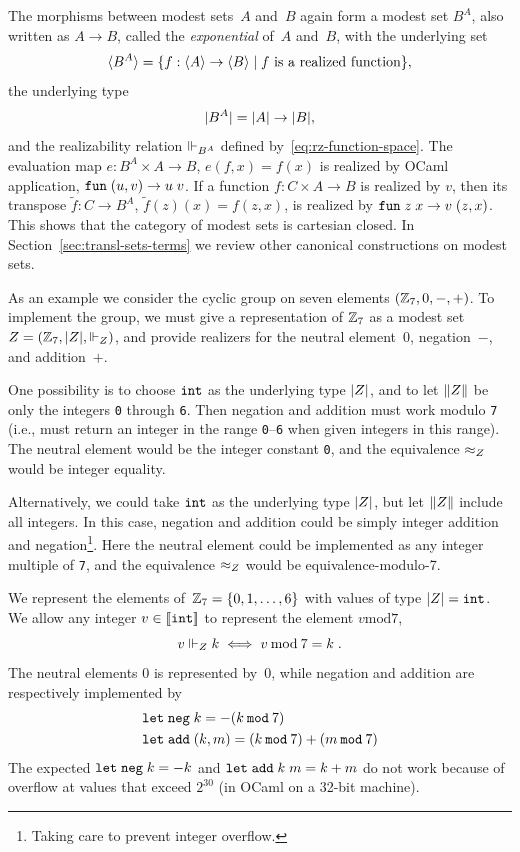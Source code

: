 The morphisms between modest sets~$A$ and~$B$ again form a modest set
$B^A$, also written as $A \to B$, called the \emph{exponential} of~$A$
and~$B$, with the underlying set
%
\begin{equation*}
  \langle B^A \rangle =
  \{f : \langle A \rangle \to \langle B \rangle \mid \text{$f$ is a realized function}\},
\end{equation*}
%
the underlying type
%
\begin{equation*}
  |B^A| = |A| \to |B|,
\end{equation*}
%
and the realizability relation $\Vdash_{B^A}$ defined
by~\eqref{eq:rz-function-space}. The evaluation map $e : B^A \times A
\to B$, $e(f,x) = f(x)$ is realized by OCaml application,
$\mathtt{fun}\;(u,v) \to u\;v$. If a function $f : C \times A \to B$ is realized
by $v$, then its transpose $\tilde{f} : C \to B^A$, $\tilde{f}(z)(x) =
f(z,x)$, is realized by $\mathtt{fun}\;z\;x \to v \; (z,x)$. This shows that the
category of modest sets is cartesian closed. In
Section~\ref{sec:transl-sets-terms} we review other canonical
constructions on modest sets.

\bigskip

As an example we consider the cyclic group on seven elements $(\mathbb{Z}_7,
0, {-}, {+})$. To implement the group, we must give a representation
of $\mathbb{Z}_7$ as a modest set~$Z = (\mathbb{Z}_7, |Z|, {\Vdash_Z})$, and
provide realizers for the neutral element~$0$, negation~$-$, and
addition~$+$. 

One possibility is to choose $\mathtt{int}$ as the underlying type $|Z|$,
and to let $\|Z\|$ be only the integers \texttt{0} through \texttt{6}.
Then negation and addition must work modulo \texttt{7} (i.e., must return an integer in the
range \texttt{0}--\texttt{6} when given integers in this range).
The neutral element would be the integer constant \texttt{0}, and the
equivalence $\approx_Z$ would be integer equality.

Alternatively, we could take $\mathtt{int}$ as the underlying type
$|Z|$, but let $\|Z\|$ include all integers. In this
case, negation and addition could be simply integer addition and
negation\footnote{Taking care to prevent integer
  overflow.}. Here the neutral element could be implemented as any
integer multiple of \texttt{7}, and the equivalence $\approx_Z$ would be
equivalence-modulo-7.

\iffalse
We represent the elements of~$\mathbb{Z}_7 = \{0, 1, \ldots,
  6\}$ with values of type $|Z| = \mathtt{int}$. We allow any integer
$v \in [\![\mathtt{int}]\!]$ to represent the element $v
\mathbin{\mathrm{mod}} 7$,
%
\begin{equation*}
  v \Vdash_Z k \iff v \mathbin{\mathrm{mod}} 7 = k \;.
\end{equation*}
%
The neutral elements $0$ is represented by~$0$, while negation and
addition are respectively implemented by
%
\begin{align*}
  &\mathtt{let}\;\mathtt{neg}\; k = -(k \mathbin{\mathtt{mod}} 7) \\
  &\mathtt{let}\;\mathtt{add}\; (k, m) = (k \mathbin{\mathtt{mod}} 7) + (m \mathbin{\mathtt{mod}} 7)
\end{align*}
%
The expected $\mathtt{let}\;\mathtt{neg}\; k = -k$ and $\mathtt{let}\;\mathtt{add}\;
  k\; m = k+m$ do not work because of overflow at values that exceed
$2^{30}$ (in OCaml on a 32-bit machine). 

